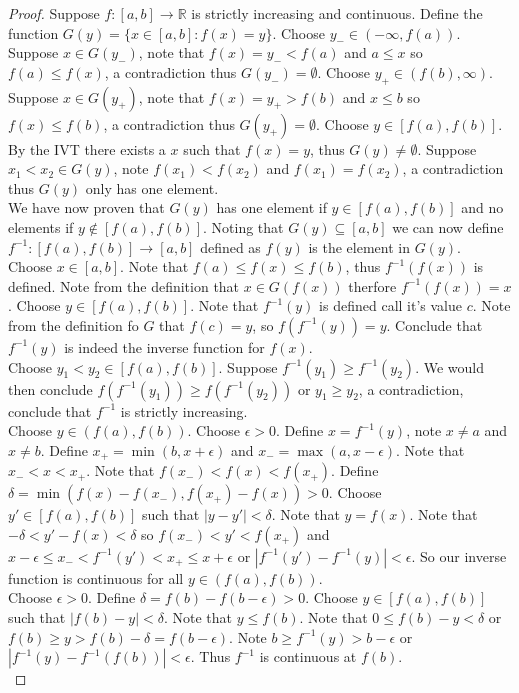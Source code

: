 \documentclass[12pt]{article}
\theoremstyle{homework}
\begin{document}
\begin{proof}
Suppose $f : [a, b] \rightarrow \mathbb{R}$ is strictly increasing and continuous.  Define the function $G(y)=\{x\in[a, b] :f(x)=y \}$.  Choose $y_-\in (-\infty,f(a))$.  Suppose $x\in G(y_-)$, note that $f(x)=y_-<f(a)$ and $a\leq x$ so $f(a)\leq f(x)$, a contradiction thus $G(y_-)=\emptyset$.  Choose $y_+\in (f(b),\infty)$.  Suppose $x\in G(y_+)$, note that $f(x)=y_+>f(b)$ and $x\leq b$ so $f(x)\leq f(b)$, a contradiction thus $G(y_+)=\emptyset$.  Choose $y\in [f(a),f(b)]$.  By the IVT there exists a $x$ such that $f(x)=y$, thus $G(y)\neq \emptyset$.  Suppose $x_1<x_2\in G(y)$, note $f(x_1)<f(x_2)$ and $f(x_1)=f(x_2)$, a contradiction thus $G(y)$ only has one element.\\
We have now proven that $G(y)$ has one element if $y\in[f(a), f(b)]$ and no elements if $y\not\in[f(a), f(b)]$.  Noting that $G(y)\subseteq[a, b] $ we can now define $f^{-1}:[f(a), f(b)]\rightarrow [a, b]$ defined as $f(y)$ is the element in $G(y)$.\\
Choose $x\in [a,b]$.  Note that $f(a)\leq f(x)\leq f(b)$, thus $f^{-1}(f(x))$ is defined.  Note from the definition that $x\in G(f(x))$ therfore $f^{-1}(f(x))=x$.  Choose $y\in[f(a), f(b)]$.  Note that $f^{-1}(y)$ is defined call it's value $c$. Note from the definition fo $G$ that $f(c)=y$, so $f(f^{-1}(y))=y$.  Conclude that $f^{-1}(y)$ is indeed the inverse function for $f(x)$.\\
Choose $y_1<y_2\in[f(a), f(b)]$.  Suppose $f^{-1}(y_1)\geq f^{-1}(y_2)$.  We would then conclude $f(f^{-1}(y_1))\geq f(f^{-1}(y_2))$ or $y_1\geq y_2$, a contradiction, conclude that $f^{-1}$ is strictly increasing.\\
Choose $y\in (f(a), f(b))$.  Choose $\epsilon>0$.  Define $x=f^{-1}(y)$, note $x\neq a$ and $x\neq b$.  Define $x_+=\min(b,x+\epsilon)$ and $x_-=\max(a,x-\epsilon)$.  Note that $x_-<x<x_+$.  Note that $f(x_-)<f(x)<f(x_+)$.  Define $\delta=\min(f(x)-f(x_-),f(x_+)-f(x))>0$.  Choose $y'\in [f(a), f(b)]$ such that $|y-y'|<\delta$.  Note that $y=f(x)$.  Note that $-\delta<y'-f(x)<\delta$ so $f(x_-)<y'<f(x_+)$ and $x-\epsilon\leq x_-<f^{-1}(y')<x_+\leq x+\epsilon$ or $|f^{-1}(y')-f^{-1}(y)|<\epsilon$.  So our inverse function is continuous for all $y\in (f(a), f(b))$.\\
Choose $\epsilon>0$.  Define $\delta=f(b)-f(b-\epsilon)>0$.  Choose $y\in [f(a), f(b)]$ such that $|f(b)-y|<\delta$.  Note that $y\leq f(b)$.  Note that $0 \leq f(b)-y<\delta$ or $f(b) \geq y>f(b)-\delta=f(b-\epsilon)$.  Note $b \geq f^{-1}(y)>b-\epsilon$ or $|f^{-1}(y)-f^{-1}(f(b))|<\epsilon$.  Thus $f^{-1}$ is continuous at $f(b)$.\\

\end{proof}
\end{document}
